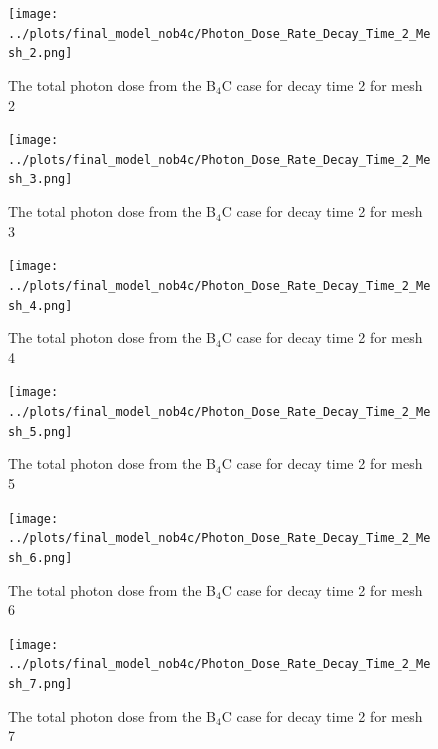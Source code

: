 \documentclass[12pt]{article}
\begin{document}
\begin{figure}[ht!]
\centering
\texttt{[image: ../plots/final\_model\_nob4c/Photon\_Dose\_Rate\_Decay\_Time\_2\_Mesh\_2.png]}
\label{fig:photons_dc2_no4bc_m2_flux}
\caption{The total photon dose from the B$_4$C case for decay time 2 for mesh 2}
\end{figure}

\begin{figure}[ht!]
\centering
\texttt{[image: ../plots/final\_model\_nob4c/Photon\_Dose\_Rate\_Decay\_Time\_2\_Mesh\_3.png]}
\label{fig:photons_dc2_no4bc_m3_flux}
\caption{The total photon dose from the B$_4$C case for decay time 2 for mesh 3}
\end{figure}

\begin{figure}[ht!]
\centering
\texttt{[image: ../plots/final\_model\_nob4c/Photon\_Dose\_Rate\_Decay\_Time\_2\_Mesh\_4.png]}
\label{fig:photons_dc2_no4bc_m4_flux}
\caption{The total photon dose from the B$_4$C case for decay time 2 for mesh 4}
\end{figure}

\begin{figure}[ht!]
\centering
\texttt{[image: ../plots/final\_model\_nob4c/Photon\_Dose\_Rate\_Decay\_Time\_2\_Mesh\_5.png]}
\label{fig:photons_dc2_no4bc_m5_flux}
\caption{The total photon dose from the B$_4$C case for decay time 2 for mesh 5}
\end{figure}

\begin{figure}[ht!]
\centering
\texttt{[image: ../plots/final\_model\_nob4c/Photon\_Dose\_Rate\_Decay\_Time\_2\_Mesh\_6.png]}
\label{fig:photons_dc2_no4bc_m6_flux}
\caption{The total photon dose from the B$_4$C case for decay time 2 for mesh 6}
\end{figure}

\begin{figure}[ht!]
\centering
\texttt{[image: ../plots/final\_model\_nob4c/Photon\_Dose\_Rate\_Decay\_Time\_2\_Mesh\_7.png]}
\label{fig:photons_dc2_no4bc_m7_flux}
\caption{The total photon dose from the B$_4$C case for decay time 2 for mesh 7}
\end{figure}
\newpage
\clearpage
\end{document}
